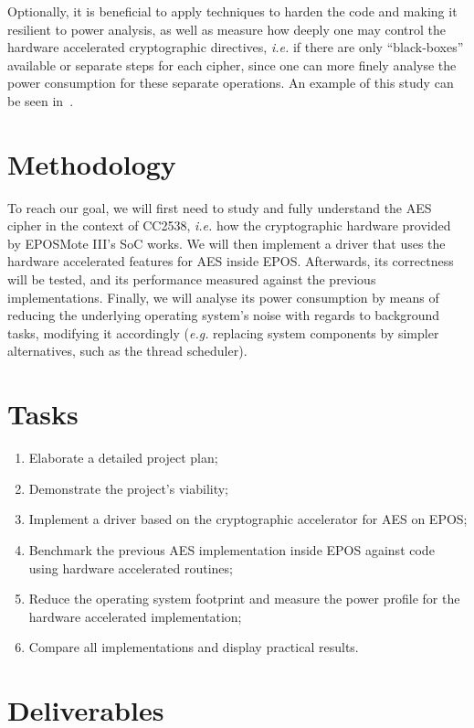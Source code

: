 \documentclass{../sftex/sftex}
\begin{document}
Optionally, it is beneficial to apply techniques to harden the code and making
it resilient to power analysis, as well as measure how deeply one may control
the hardware accelerated cryptographic directives, \emph{i.e.} if there are
only ``black-boxes'' available or separate steps for each cipher, since one can
more finely analyse the power consumption for these separate operations. An
example of this study can be seen in~\cite{Schwabe:inproc:2016:aug}.

\section{Methodology}

To reach our goal, we will first need to study and fully understand the AES
cipher in the context of CC2538, \emph{i.e.} how the cryptographic hardware
provided by EPOSMote III's SoC works. We will then implement a driver that uses
the hardware accelerated features for AES inside EPOS\@. Afterwards, its
correctness will be tested, and its performance measured against the previous
implementations. Finally, we will analyse its power consumption by means of
reducing the underlying operating system's noise with regards to background
tasks, modifying it accordingly (\emph{e.g.} replacing system components by
simpler alternatives, such as the thread scheduler).

\section{Tasks}

\begin{enumerate}
  \item Elaborate a detailed project plan;
  \item Demonstrate the project's viability;
  \item Implement a driver based on the cryptographic accelerator for AES on
  EPOS\@;
  \item Benchmark the previous AES implementation inside EPOS against code
  using hardware accelerated routines;
  \item Reduce the operating system footprint and measure the power profile for
  the hardware accelerated implementation;
  \item Compare all implementations and display practical results.
\end{enumerate}

\section{Deliverables}
\end{document}
